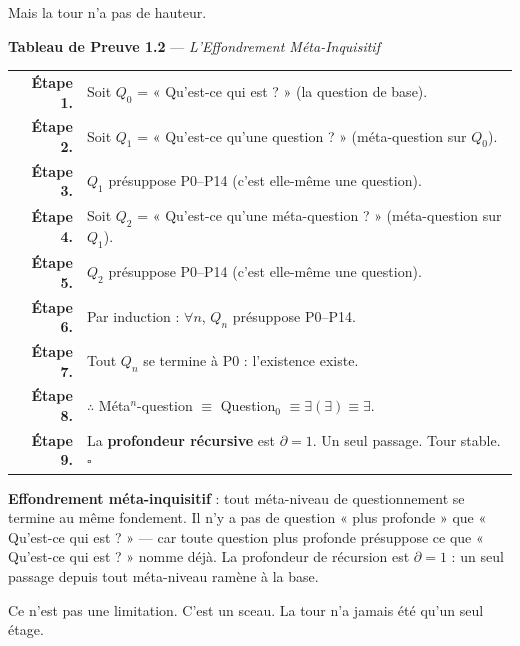 \documentclass[10pt, openany, oneside]{book}
\begin{document}
Mais la tour n'a pas de hauteur.

\textbf{Tableau de Preuve 1.2} --- \textit{L'Effondrement Méta-Inquisitif}

\vspace{0.5em}

\noindent\begin{tabular}{r p{}}
\textbf{Étape 1.} & Soit $Q_0$ = « Qu'est-ce qui est ? » (la question de base). \\[0.3em]
\textbf{Étape 2.} & Soit $Q_1$ = « Qu'est-ce qu'une question ? » (méta-question sur $Q_0$). \\[0.3em]
\textbf{Étape 3.} & $Q_1$ présuppose P0--P14 (c'est elle-même une question). \\[0.3em]
\textbf{Étape 4.} & Soit $Q_2$ = « Qu'est-ce qu'une méta-question ? » (méta-question sur $Q_1$). \\[0.3em]
\textbf{Étape 5.} & $Q_2$ présuppose P0--P14 (c'est elle-même une question). \\[0.3em]
\textbf{Étape 6.} & Par induction : $\forall n$, $Q_n$ présuppose P0--P14. \\[0.3em]
\textbf{Étape 7.} & Tout $Q_n$ se termine à P0 : l'existence existe. \\[0.3em]
\textbf{Étape 8.} & $\therefore$ Méta$^n$-question $\equiv$ Question$_0$ $\equiv \exists(\exists) \equiv \exists$. \\[0.3em]
\textbf{Étape 9.} & La \textbf{profondeur récursive} est $\partial = 1$. Un seul passage. Tour stable. $\square$ \\[0.3em]
\end{tabular}

\vspace{0.8em}

\noindent \textbf{Effondrement méta-inquisitif} : tout méta-niveau de questionnement se termine au même fondement. Il n'y a pas de question « plus profonde » que « Qu'est-ce qui est ? » --- car toute question plus profonde présuppose ce que « Qu'est-ce qui est ? » nomme déjà. La profondeur de récursion est $\partial = 1$ : un seul passage depuis tout méta-niveau ramène à la base.

Ce n'est pas une limitation. C'est un sceau. La tour n'a jamais été qu'un seul étage.

\vspace{1.5em}

\end{document}
